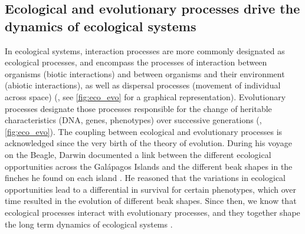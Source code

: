 \subsection{Ecological and evolutionary processes drive the dynamics of ecological systems}
% 
%
% 
In ecological systems, interaction processes are more commonly designated as ecological processes, and encompass the processes of interaction between organisms (biotic interactions) and between organisms and their environment (abiotic interactions), as well as dispersal processes (movement of individual across space) (\cite{Vellend2010a}, see \cref{fig:eco_evo} for a graphical representation).
% 
Evolutionary processes designate those processes responsible for the change of heritable characteristics (DNA, genes, phenotypes) over successive generations (\cite{Hall2013}, \cref{fig:eco_evo}).
% 
The coupling between ecological and evolutionary processes is acknowledged since the very birth of the theory of evolution. 
% 
During his voyage on the Beagle, Darwin documented a link between the different ecological opportunities across the Galápagos Islands and the different beak shapes in the finches he found on each island \citep{darwin2004origin}.
% 
He reasoned that the variations in ecological opportunities lead to a differential in survival for certain phenotypes, which over time resulted in the evolution of different beak shapes.
% 
Since then, we know that ecological processes interact with evolutionary processes, and they together shape the long term dynamics of ecological systems \citep{Urban2016,Rahbek2019a,Rangel2018,Hagen2022}.

